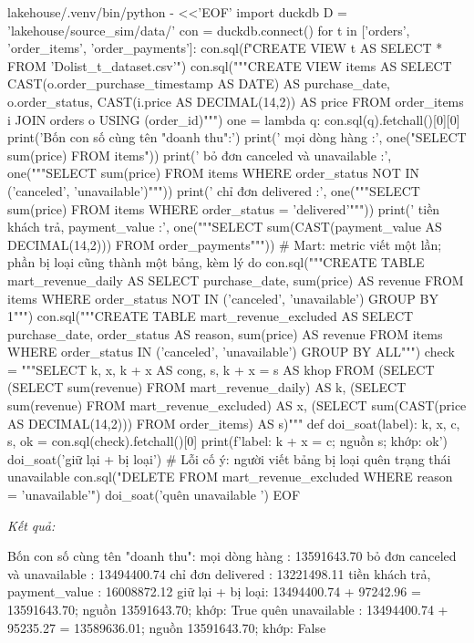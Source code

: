 \begin{codeblock}
lakehouse/.venv/bin/python - <<'EOF'
import duckdb
D = 'lakehouse/source_sim/data/'
con = duckdb.connect()
for t in ['orders', 'order_items', 'order_payments']:
    con.sql(f"CREATE VIEW {t} AS SELECT * FROM '{D}olist_{t}_dataset.csv'")
con.sql("""CREATE VIEW items AS
  SELECT CAST(o.order_purchase_timestamp AS DATE) AS purchase_date, o.order_status,
         CAST(i.price AS DECIMAL(14,2)) AS price
  FROM order_items i JOIN orders o USING (order_id)""")
one = lambda q: con.sql(q).fetchall()[0][0]
print('Bốn con số cùng tên "doanh thu":')
print('  mọi dòng hàng                  :', one("SELECT sum(price) FROM items"))
print('  bỏ đơn canceled và unavailable :', one("""SELECT sum(price) FROM items
                                  WHERE order_status NOT IN ('canceled', 'unavailable')"""))
print('  chỉ đơn delivered              :', one("""SELECT sum(price) FROM items
                                  WHERE order_status = 'delivered'"""))
print('  tiền khách trả, payment_value  :', one("""SELECT sum(CAST(payment_value
                                  AS DECIMAL(14,2))) FROM order_payments"""))
# Mart: metric viết một lần; phần bị loại cũng thành một bảng, kèm lý do
con.sql("""CREATE TABLE mart_revenue_daily AS
  SELECT purchase_date, sum(price) AS revenue FROM items
  WHERE order_status NOT IN ('canceled', 'unavailable') GROUP BY 1""")
con.sql("""CREATE TABLE mart_revenue_excluded AS
  SELECT purchase_date, order_status AS reason, sum(price) AS revenue FROM items
  WHERE order_status IN ('canceled', 'unavailable') GROUP BY ALL""")
check = """SELECT k, x, k + x AS cong, s, k + x = s AS khop FROM (SELECT
  (SELECT sum(revenue) FROM mart_revenue_daily) AS k,
  (SELECT sum(revenue) FROM mart_revenue_excluded) AS x,
  (SELECT sum(CAST(price AS DECIMAL(14,2))) FROM order_items) AS s)"""
def doi_soat(label):
    k, x, c, s, ok = con.sql(check).fetchall()[0]
    print(f'{label}: {k} + {x} = {c}; nguồn {s}; khớp: {ok}')
doi_soat('giữ lại + bị loại')
# Lỗi cố ý: người viết bảng bị loại quên trạng thái unavailable
con.sql("DELETE FROM mart_revenue_excluded WHERE reason = 'unavailable'")
doi_soat('quên unavailable ')
EOF
\end{codeblock}
\textit{Kết quả:}
\begin{codeblock}
Bốn con số cùng tên "doanh thu":
  mọi dòng hàng                  : 13591643.70
  bỏ đơn canceled và unavailable : 13494400.74
  chỉ đơn delivered              : 13221498.11
  tiền khách trả, payment_value  : 16008872.12
giữ lại + bị loại: 13494400.74 + 97242.96 = 13591643.70; nguồn 13591643.70; khớp: True
quên unavailable : 13494400.74 + 95235.27 = 13589636.01; nguồn 13591643.70; khớp: False
\end{codeblock}


